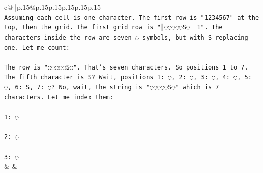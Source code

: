 \documentclass{article}
\begin{document}
{\begin{supertabular}{c@{$\;$}|p{.15\linewidth}@{}p{.15\linewidth}p{.15\linewidth}p{.15\linewidth}p{.15\linewidth}p{.15\linewidth}}
{{{\\ 
\texttt{Assuming each cell is one character. The first row is "1234567" at the top, then the grid. The first grid row is "║◌◌◌◌◌S◌║ 1". The characters inside the row are seven ◌ symbols, but with S replacing one. Let me count:} \\
\\ 
\texttt{The row is "◌◌◌◌◌S◌". That's seven characters. So positions 1 to 7. The fifth character is S? Wait, positions 1: ◌, 2: ◌, 3: ◌, 4: ◌, 5: ◌, 6: S, 7: ◌? No, wait, the string is "◌◌◌◌◌S◌" which is 7 characters. Let me index them:} \\
\\ 
\texttt{1: ◌} \\
\\ 
\texttt{2: ◌} \\
\\ 
\texttt{3: ◌} \\
            }
        }
    }
    & & \\ \\


\end{supertabular}}
\end{document}
